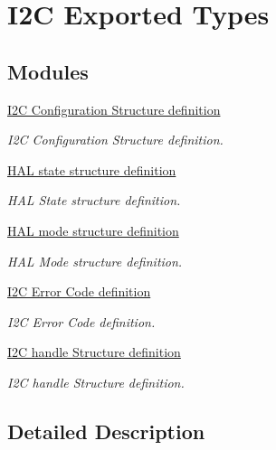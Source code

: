 \hypertarget{group___i2_c___exported___types}{}\section{I2C Exported Types}
\label{group___i2_c___exported___types}
\subsection*{Modules}
\begin{DoxyCompactItemize}
\item 
\hyperlink{group___i2_c___configuration___structure__definition}{I2\+C Configuration Structure definition}
\begin{DoxyCompactList}\small\item\em I2C Configuration Structure definition. \end{DoxyCompactList}\item 
\hyperlink{group___h_a_l__state__structure__definition}{H\+A\+L state structure definition}
\begin{DoxyCompactList}\small\item\em H\+AL State structure definition. \end{DoxyCompactList}\item 
\hyperlink{group___h_a_l__mode__structure__definition}{H\+A\+L mode structure definition}
\begin{DoxyCompactList}\small\item\em H\+AL Mode structure definition. \end{DoxyCompactList}\item 
\hyperlink{group___i2_c___error___code__definition}{I2\+C Error Code definition}
\begin{DoxyCompactList}\small\item\em I2C Error Code definition. \end{DoxyCompactList}\item 
\hyperlink{group___i2_c__handle___structure__definition}{I2\+C handle Structure definition}
\begin{DoxyCompactList}\small\item\em I2C handle Structure definition. \end{DoxyCompactList}\end{DoxyCompactItemize}


\subsection{Detailed Description}
